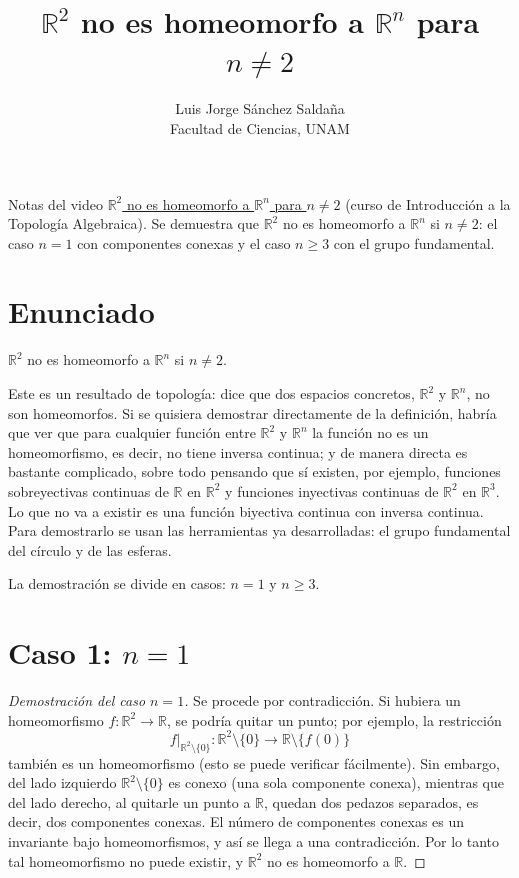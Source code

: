 \documentclass[11pt]{article}
\title{$\mathbb{R}^2$ no es homeomorfo a $\mathbb{R}^n$ para $n\neq 2$}
\author{Luis Jorge Sánchez Saldaña\\[2pt]\small Facultad de Ciencias, UNAM}
\date{}
\begin{document}
\maketitle

\noindent\small Notas del video
\href{https://www.youtube.com/watch?v=pI16TtLD0tM}{\guillemotleft{}$\mathbb{R}^2$ no es homeomorfo a $\mathbb{R}^n$ para $n\neq 2$\guillemotright{}}
(curso de Introducción a la Topología Algebraica). Se demuestra que $\mathbb{R}^2$ no es homeomorfo a $\mathbb{R}^n$ si $n\neq 2$: el caso $n=1$ con componentes conexas y el caso $n\geq 3$ con el grupo fundamental.
\normalsize

\section*{Enunciado}

\begin{teo}\label{teo:r2rn}
$\mathbb{R}^2$ no es homeomorfo a $\mathbb{R}^n$ si $n\neq 2$.
\end{teo}

Este es un resultado de topología: dice que dos espacios concretos, $\mathbb{R}^2$ y $\mathbb{R}^n$, no son homeomorfos. Si se quisiera demostrar directamente de la definición, habría que ver que para cualquier función entre $\mathbb{R}^2$ y $\mathbb{R}^n$ la función no es un homeomorfismo, es decir, no tiene inversa continua; y de manera directa es bastante complicado, sobre todo pensando que sí existen, por ejemplo, funciones sobreyectivas continuas de $\mathbb{R}$ en $\mathbb{R}^2$ y funciones inyectivas continuas de $\mathbb{R}^2$ en $\mathbb{R}^3$. Lo que no va a existir es una función biyectiva continua con inversa continua. Para demostrarlo se usan las herramientas ya desarrolladas: el grupo fundamental del círculo y de las esferas.

La demostración se divide en casos: $n=1$ y $n\geq 3$.

\section*{Caso 1: $n=1$}

\begin{proof}[Demostración del caso $n=1$]
Se procede por contradicción. Si hubiera un homeomorfismo $f\colon\mathbb{R}^2\to\mathbb{R}$, se podría quitar un punto; por ejemplo, la restricción
\[
  f|_{\mathbb{R}^2\setminus\{0\}}\colon\mathbb{R}^2\setminus\{0\}\longrightarrow\mathbb{R}\setminus\{f(0)\}
\]
también es un homeomorfismo (esto se puede verificar fácilmente). Sin embargo, del lado izquierdo $\mathbb{R}^2\setminus\{0\}$ es conexo (una sola componente conexa), mientras que del lado derecho, al quitarle un punto a $\mathbb{R}$, quedan dos pedazos separados, es decir, dos componentes conexas. El número de componentes conexas es un invariante bajo homeomorfismos, y así se llega a una contradicción. Por lo tanto tal homeomorfismo no puede existir, y $\mathbb{R}^2$ no es homeomorfo a $\mathbb{R}$.
\end{proof}
\end{document}
